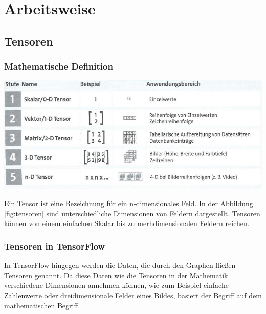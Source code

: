 \chapter{Arbeitsweise}
\label{chap:arbeitsweise}
\section{Tensoren}
\label{sec:tensoren}
\printsubchapterauthor{\authorNiklas}

\subsection{Mathematische Definition}
\label{sec:mathematischeDefinition}
\begin{center}
\includegraphics[width=.6\textwidth]{../abbildungen/5-9.pdf}
	\label{fig:tensoren}
\end{center}

Ein Tensor ist eine Bezeichnung für ein n-dimensionales Feld. In der Abbildung \ref{fig:tensoren} sind unterschiedliche Dimensionen von Feldern dargestellt. Tensoren können von einem einfachen Skalar bis zu merhdimensionalen Feldern reichen.\citep{Einfuehrung}

\subsection{Tensoren in TensorFlow}
\label{sec:tensorenInTensorflow}
In TensorFlow hingegen werden die Daten, die durch den Graphen fließen Tensoren genannt. Da diese Daten wie die Tensoren in der Mathematik verschiedene Dimensionen annehmen können, wie zum Beispiel einfache Zahlenwerte oder dreidimensionale Felder eines Bildes, basiert der Begriff auf dem mathematischen Begriff. 

